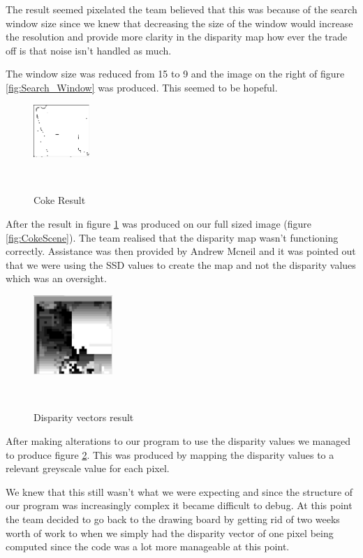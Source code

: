 \documentclass[twocolumn]{article}
\begin{document}
The result seemed pixelated the team believed that this was because of the search window size since we knew that decreasing the size of the window would increase the resolution and provide more clarity in the disparity map how ever the trade off is that noise isn't handled as much. 

The window size was reduced from 15 to 9 and the image on the right of figure \ref{fig:Search_Window} was produced. This seemed to be hopeful.

\begin{figure}[H]
\centering
  \includegraphics[height=20mm]{Figures/Coke_Result}
    \caption{Coke Result}~\label{fig:Coke_Result}
\end{figure} 

After the result in figure \ref{fig:Coke_Result} was produced on our full sized image (figure \ref{fig:CokeScene}). The team realised that the disparity map wasn't functioning correctly. Assistance was then provided by Andrew Mcneil and it was pointed out that we were using the SSD values to create the map and not the disparity values which was an oversight.  

 \begin{figure}[H]
\centering
  \includegraphics[height=30mm]{Figures/Disp_Vectors_1}
    \caption{Disparity vectors result}~\label{fig:Disp_Vectors_1}
\end{figure} 

After making alterations to our program to use the disparity values we managed to produce figure \ref{fig:Disp_Vectors_1}. This was produced by mapping the disparity values to a relevant greyscale value for each pixel. 

We knew that this still wasn't what we were expecting and since the structure of our program was increasingly complex it became difficult to debug. At this point the team decided to go back to the drawing board by getting rid of two weeks worth of work to when we simply had the disparity vector of one pixel being computed since the code was a lot more manageable at this point. 
\end{document}
